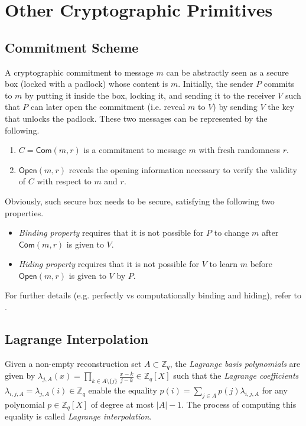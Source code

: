 \documentclass[letterpaper,twocolumn,10pt]{article}
\theoremstyle{definition}
\theoremstyle{remark}
\begin{document}
\section{Other Cryptographic Primitives}
\subsection{Commitment Scheme}
\label{appendix:commitment}
A cryptographic commitment \cite{blum1983coin} to message $m$ can be abstractly seen as a secure box (locked with a padlock) whose content is $m$. Initially, the sender $P$ commits to $m$ by putting it inside the box, locking it, and sending it to the receiver $V$ such that $P$ can later open the commitment (i.e. reveal $m$ to $V$) by sending $V$ the key that unlocks the padlock. These two messages can be represented by the following.
\begin{enumerate}
\item $C = \mathsf{Com}(m, r)$ is a commitment to message $m$ with fresh randomness $r$.
\item $\mathsf{Open}(m, r)$ reveals the opening information necessary to verify the validity of $C$ with respect to $m$ and $r$.
\end{enumerate}

Obviously, such secure box needs to be secure, satisfying the following two properties.
\begin{itemize}
\item \textit{Binding property} requires that it is not possible for $P$ to change $m$ after $\mathsf{Com}(m, r)$ is given to $V$.
\item \textit{Hiding property} requires that it is not possible for $V$ to learn $m$ before $\mathsf{Open}(m, r)$ is given to $V$ by $P$.
\end{itemize}

For further details (e.g. perfectly vs computationally binding and hiding), refer to \cite{damgaard1998commitment}.

\subsection{Lagrange Interpolation}
\label{appendix:lagrange}
Given a non-empty reconstruction set $A \subset \mathbb{Z}_q$, the \textit{Lagrange basis polynomials} are given by $\lambda_{j, A}(x) = \prod_{k \in A \setminus \{j\}} \frac{x - k}{j - k} \in \mathbb{Z}_q[X]$ such that the \textit{Lagrange coefficients} $\lambda_{i, j, A} = \lambda_{j, A}(i) \in \mathbb{Z}_q$ enable the equality $p(i) = \sum_{j \in A} p(j) \lambda_{i, j, A}$ for any polynomial $p \in \mathbb{Z}_q[X]$ of degree at most $|A| - 1$. The process of computing this equality is called \textit{Lagrange interpolation}.
\end{document}
